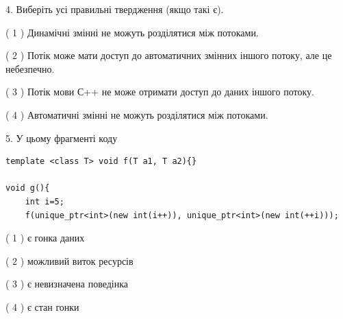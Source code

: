 \documentclass[12pt, ukrainian]{article}
\begin{document}
\begin {large}
{%
4. Виберіть усі правильні твердження (якщо такі є).\par
\vspace{2mm}

( 1 ) Динамічні змінні не можуть розділятися між потоками.%

( 2 ) Потік може мати доступ до автоматичних змінних іншого потоку, але це небезпечно.%

( 3 ) Потік мови С++ не може отримати доступ до даних іншого потоку.%

( 4 ) Автоматичні змінні не можуть розділятися між потоками.%


5. У цьому фрагменті коду
\begin{verbatim}
template <class T> void f(T a1, T a2){}

void g(){
    int i=5;
    f(unique_ptr<int>(new int(i++)), unique_ptr<int>(new int(++i)));
\end{verbatim}

( 1 ) є гонка даних%

( 2 ) можливий виток ресурсів%

( 3 ) є невизначена поведінка%

( 4 ) є стан гонки%
}
\end {large}
\end{document}
